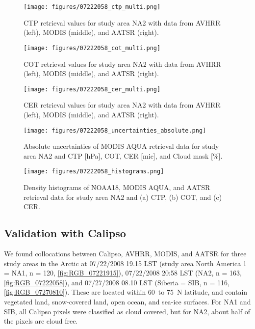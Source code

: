 \begin{figure*}[h]
  \texttt{[image: figures/07222058\_ctp\_multi.png]}
  \caption{CTP retrieval values for study area NA2 with data from AVHRR (left), MODIS (middle), and AATSR (right).}
  \label{fig:CTP_intercomparison}

  \texttt{[image: figures/07222058\_cot\_multi.png]}
  \caption{COT retrieval values for study area NA2 with data from AVHRR (left), MODIS (middle), and AATSR (right).}
  \label{fig:COT_intercomparison}

  \texttt{[image: figures/07222058\_cer\_multi.png]}
  \caption{CER retrieval values for study area NA2 with data from AVHRR (left), MODIS (middle), and AATSR (right).}
  \label{fig:CER_intercomparison}
\end{figure*}

\begin{figure*}[h]
  \texttt{[image: figures/07222058\_uncertainties\_absolute.png]} %
  \caption{Absolute uncertainties of MODIS AQUA retrieval data for study area NA2 and CTP [hPa], COT, CER [mic], and Cloud mask [\%].} %
  \label{fig:uncertainties}
\end{figure*}

\begin{figure*}[h]
  \texttt{[image: figures/07222058\_histograms.png]}
  \caption{Density histograms of NOAA18, MODIS AQUA, and AATSR retrieval data for study area NA2 and (a) CTP, (b) COT, and (c) CER.}
  \label{fig:histograms}
\end{figure*}

\subsection{Validation with Calipso}

We found collocations between Calipso, AVHRR, MODIS, and AATSR for three study areas in the Arctic at 07/22/2008 19.15 LST (study area North America 1 = NA1, n = 120, \cref{fig:RGB_07221915}), 07/22/2008 20:58 LST (NA2, n = 163, \cref{fig:RGB_07222058}), and 07/27/2008 08.10 LST (Siberia = SIB, n = 116, \cref{fig:RGB_07270810}). These are located within 60\textdegree\ to 75\textdegree\ N latitude, and contain vegetated land, snow-covered land, open ocean, and sea-ice surfaces. For NA1 and SIB, all Calipso pixels were classified as cloud covered, but for NA2, about half of the pixels are cloud free.

